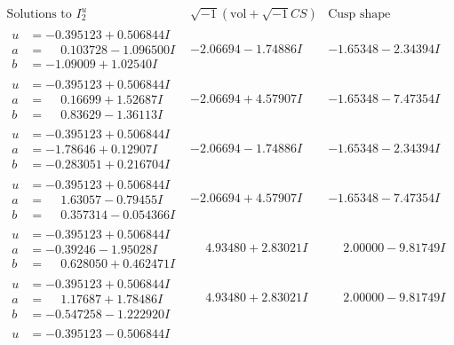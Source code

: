 \documentclass[1p]{elsarticle_modified}
\theoremstyle{definition}
\newcommand{\I}{\sqrt{-1}}
\begin{document}
$$\begin{array}{c|c|c}  
\text{Solutions to }I^u_{2}& \I (\text{vol} + \sqrt{-1}CS) & \text{Cusp shape}\\
 \hline 
\begin{aligned}
u &= -0.395123 + 0.506844 I \\
a &= \phantom{-}0.103728 - 1.096500 I \\
b &= -1.09009 + 1.02540 I\end{aligned}
 & -2.06694 - 1.74886 I & -1.65348 - 2.34394 I \\ \hline\begin{aligned}
u &= -0.395123 + 0.506844 I \\
a &= \phantom{-}0.16699 + 1.52687 I \\
b &= \phantom{-}0.83629 - 1.36113 I\end{aligned}
 & -2.06694 + 4.57907 I & -1.65348 - 7.47354 I \\ \hline\begin{aligned}
u &= -0.395123 + 0.506844 I \\
a &= -1.78646 + 0.12907 I \\
b &= -0.283051 + 0.216704 I\end{aligned}
 & -2.06694 - 1.74886 I & -1.65348 - 2.34394 I \\ \hline\begin{aligned}
u &= -0.395123 + 0.506844 I \\
a &= \phantom{-}1.63057 - 0.79455 I \\
b &= \phantom{-}0.357314 - 0.054366 I\end{aligned}
 & -2.06694 + 4.57907 I & -1.65348 - 7.47354 I \\ \hline\begin{aligned}
u &= -0.395123 + 0.506844 I \\
a &= -0.39246 - 1.95028 I \\
b &= \phantom{-}0.628050 + 0.462471 I\end{aligned}
 & \phantom{-}4.93480 + 2.83021 I & \phantom{-}2.00000 - 9.81749 I \\ \hline\begin{aligned}
u &= -0.395123 + 0.506844 I \\
a &= \phantom{-}1.17687 + 1.78486 I \\
b &= -0.547258 - 1.222920 I\end{aligned}
 & \phantom{-}4.93480 + 2.83021 I & \phantom{-}2.00000 - 9.81749 I \\ \hline\begin{aligned}
u &= -0.395123 - 0.506844 I \\

\end{aligned}
\end{array}$$
\end{document}
